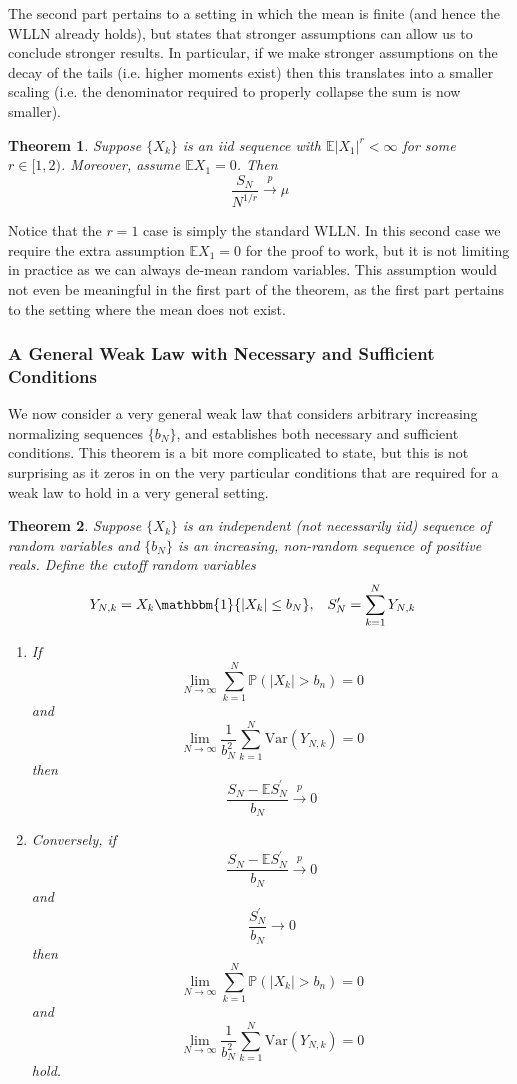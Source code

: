 \documentclass[12pt]{article}
\newcommand*{\abs}[1]{\left\lvert#1\right\rvert}
\newcommand{\E}{\mathbb{E}}
\newcommand{\Var}{\mathrm{Var}}
\newcommand{\Prob}{\mathbb{P}}
\newtheorem{thm}{Theorem}
\begin{document}
The second part pertains to a setting in which the mean is finite (and hence the WLLN already holds), but states that stronger assumptions can allow us to conclude stronger results. 
In particular, if we make stronger assumptions 
on the decay of the tails (i.e. higher moments exist) then this translates into a smaller scaling (i.e. the denominator required to properly collapse the sum is now smaller). 
\begin{thm} 
Suppose $\{X_k\}$ is an iid sequence with $\E\abs{X_1}^r < \infty$ for some $r \in [1, 2)$. Moreover, assume $\E X_1 = 0$. Then 
\[\frac{S_N}{N^{1/r}} \overset{p}{\to} \mu\]
\end{thm}
Notice that the $r = 1$ case is simply the standard WLLN. In this second case we require the extra assumption $\E X_1 = 0$ for the proof to work, but it is not limiting in practice as we can 
always de-mean random variables. This assumption would not even be meaningful in the first part of the theorem, as the first part pertains to the setting where the mean does not exist. 

\subsubsection{A General Weak Law with Necessary and Sufficient Conditions}
We now consider a very general weak law that considers arbitrary increasing normalizing sequences $\{b_N\}$, and establishes both necessary and sufficient conditions. This theorem is a bit 
more complicated to state, but this is not surprising as it zeros in on the very particular conditions that are required for a weak law to hold in a very general setting. 
\begin{thm}
Suppose $\{X_k\}$ is an independent (not necessarily iid) sequence of random variables and $\{b_N\}$ is an increasing, non-random sequence of positive reals. Define the cutoff random variables 
\begin{align*}
&Y_{N, k} = X_k \mathbbm{1}\{\abs{X_k} \leq b_N\}, &&S_N^\prime = \sum_{k = 1}^{N} Y_{N, k}
\end{align*}
\begin{enumerate}
\item If
\[\lim_{N \to \infty} \sum_{k = 1}^{N} \Prob(\abs{X_k} > b_n) = 0\]
and 
\[\lim_{N \to \infty} \frac{1}{b_N^2} \sum_{k = 1}^{N} \Var(Y_{N, k}) = 0\]
then
\[\frac{S_N - \E S_N^\prime}{b_N} \overset{p}{\to} 0\]

\item Conversely, if 
\[\frac{S_N - \E S_N^\prime}{b_N} \overset{p}{\to} 0\]
and 
\[\frac{S_N^\prime}{b_N} \to 0\]
then 
\[\lim_{N \to \infty} \sum_{k = 1}^{N} \Prob(\abs{X_k} > b_n) = 0\]
and 
\[\lim_{N \to \infty} \frac{1}{b_N^2} \sum_{k = 1}^{N} \Var(Y_{N, k}) = 0\]
hold. 
\end{enumerate}
\end{thm}
\end{document}
